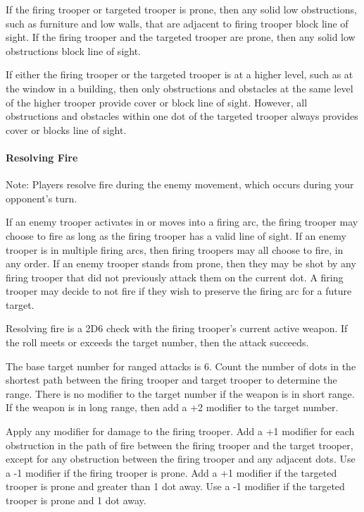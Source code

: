 If the firing trooper or targeted trooper is prone, then any solid low obstructions, such as furniture and low walls, that are adjacent to firing trooper block line of sight.
If the firing trooper and the targeted trooper are prone, then any solid low obstructions block line of sight.

If either the firing trooper or the targeted trooper is at a higher level, such as at the window in a building, then only obstructions and obstacles at the same level of the higher trooper provide cover or block line of sight.
However, all obstructions and obstacles within one dot of the targeted trooper always provides cover or blocks line of sight.

\paragraph*{Resolving Fire}

Note: Players resolve fire during the enemy movement, which occurs during your opponent's turn.

If an enemy trooper activates in or moves into a firing arc, the firing trooper may choose to fire as long as the firing trooper has a valid line of sight.
If an enemy trooper is in multiple firing arcs, then firing troopers may all choose to fire, in any order.
If an enemy trooper stands from prone, then they may be shot by any firing trooper that did not previously attack them on the current dot.
A firing trooper may decide to not fire if they wish to preserve the firing arc for a future target.

Resolving fire is a 2D6 check with the firing trooper's current active weapon.
If the roll meets or exceeds the target number, then the attack succeeds.

The base target number for ranged attacks is 6.
Count the number of dots in the shortest path between the firing trooper and target trooper to determine the range.
There is no modifier to the target number if the weapon is in short range.
If the weapon is in long range, then add a +2 modifier to the target number.

Apply any modifier for damage to the firing trooper.
Add a +1 modifier for each obstruction in the path of fire between the firing trooper and the target trooper, except for any obstruction between the firing trooper and any adjacent dots.
Use a -1 modifier if the firing trooper is prone.
Add a +1 modifier if the targeted trooper is prone and greater than 1 dot away.
Use a -1 modifier if the targeted trooper is prone and 1 dot away.

